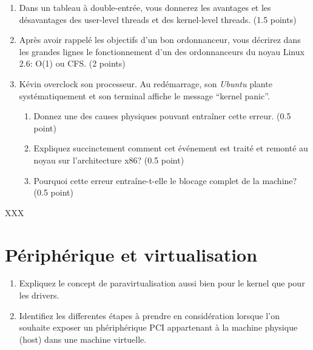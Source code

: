 \begin{enumerate}
  \item
    Dans un tableau \`a double-entr\'ee, vous donnerez les avantages et
    les d\'esavantages des user-level threads et des kernel-level threads.
    (1.5 points)
  \item
    Apr\`es avoir rappel\'e les objectifs d'un bon ordonnanceur, vous
    d\'ecrirez dans les grandes lignes le fonctionnement d'un des
    ordonnanceurs du noyau Linux 2.6: O(1) ou CFS. (2 points)
  \item
    K\'evin overclock son processeur. Au red\'emarrage, son \textit{Ubuntu}
    plante syst\'ematiquement et son terminal affiche le message
    ``kernel panic''.

    \begin{enumerate}
      \item
        Donnez une des causes physiques pouvant entra\^iner cette erreur.
        (0.5 point)
      \item
        Expliquez succinctement comment cet \'ev\'enement est trait\'e et
        remont\'e au noyau sur l'architecture x86? (0.5 point)
      \item
        Pourquoi cette erreur entra\^ine-t-elle le blocage complet de
        la machine? (0.5 point)
    \end{enumerate}
\end{enumerate}

\begin{correction}

XXX

\end{correction}

%
%

\section{P\'eriph\'erique et virtualisation
         }

\begin{enumerate}
  \item
        Expliquez le concept de paravirtualisation aussi bien pour le kernel
        que pour les drivers.
  \item 
        Identifiez les differentes \'etapes \`a prendre en consid\'eration
        lorsque l'on souhaite exposer un ph\'eriph\'erique PCI appartenant \`a la machine
        physique (host) dans une machine virtuelle.
\end{enumerate}

